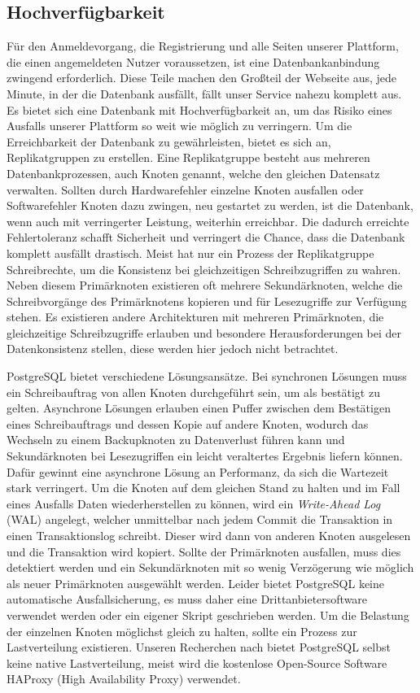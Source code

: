 \subsection{Hochverfügbarkeit}
Für den Anmeldevorgang, die Registrierung und alle Seiten unserer Plattform, die einen angemeldeten Nutzer voraussetzen, ist eine Datenbankanbindung zwingend erforderlich. Diese Teile machen den Großteil der Webseite aus, jede Minute, in der die Datenbank ausfällt, fällt unser Service nahezu komplett aus. Es bietet sich eine Datenbank mit Hochverfügbarkeit an, um das Risiko eines Ausfalls unserer Plattform so weit wie möglich zu verringern.
Um die Erreichbarkeit der Datenbank zu gewährleisten, bietet es sich an, Replikatgruppen zu erstellen. Eine Replikatgruppe besteht aus mehreren Datenbankprozessen, auch Knoten genannt, welche den gleichen Datensatz verwalten. Sollten durch Hardwarefehler einzelne Knoten ausfallen oder Softwarefehler Knoten dazu zwingen, neu gestartet zu werden, ist die Datenbank, wenn auch mit verringerter Leistung, weiterhin erreichbar. Die dadurch erreichte Fehlertoleranz schafft Sicherheit und verringert die Chance, dass die Datenbank komplett ausfällt drastisch. Meist hat nur ein Prozess der Replikatgruppe Schreibrechte, um die Konsistenz bei gleichzeitigen Schreibzugriffen zu wahren. Neben diesem Primärknoten existieren oft mehrere Sekundärknoten, welche die Schreibvorgänge des Primärknotens kopieren und für Lesezugriffe zur Verfügung stehen. Es existieren andere Architekturen mit mehreren Primärknoten, die gleichzeitige Schreibzugriffe erlauben und besondere Herausforderungen bei der Datenkonsistenz stellen, diese werden hier jedoch nicht betrachtet.

PostgreSQL bietet verschiedene Lösungsansätze. Bei synchronen Lösungen muss ein Schreibauftrag von allen Knoten durchgeführt sein, um als bestätigt zu gelten. Asynchrone Lösungen erlauben einen Puffer zwischen dem Bestätigen eines Schreibauftrags und dessen Kopie auf andere Knoten, wodurch das Wechseln zu einem Backupknoten zu Datenverlust führen kann und Sekundärknoten bei Lesezugriffen ein leicht veraltertes Ergebnis liefern können. Dafür gewinnt eine asynchrone Lösung an Performanz, da sich die Wartezeit stark verringert. Um die Knoten auf dem gleichen Stand zu halten und im Fall eines Ausfalls Daten wiederherstellen zu können, wird ein \textit{Write-Ahead Log} (WAL) angelegt, welcher unmittelbar nach jedem Commit die Transaktion in einen Transaktionslog schreibt. Dieser wird dann von anderen Knoten ausgelesen und die Transaktion wird kopiert. \cite{PG1} Sollte der Primärknoten ausfallen, muss dies detektiert werden und ein Sekundärknoten mit so wenig Verzögerung wie möglich als neuer Primärknoten ausgewählt werden. Leider bietet PostgreSQL keine automatische Ausfallsicherung, es muss daher eine Drittanbietersoftware verwendet werden oder ein eigener Skript geschrieben werden. Um die Belastung der einzelnen Knoten möglichst gleich zu halten, sollte ein Prozess zur Lastverteilung existieren. Unseren Recherchen nach bietet PostgreSQL selbst keine native Lastverteilung, meist wird die kostenlose Open-Source Software HAProxy (High Availability Proxy) verwendet.

